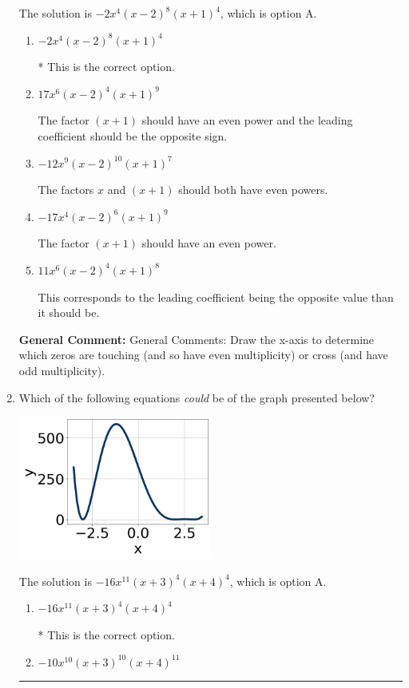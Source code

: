 \documentclass{extbook}[14pt]
\newcommand{\litem}[1]{\item #1

\rule{\textwidth}{0.4pt}}
\begin{document}
\begin{enumerate}
{The solution is \( -2x^{4} (x - 2)^{8} (x + 1)^{4} \), which is option A.\begin{enumerate}[label=\Alph*.]
\item \( -2x^{4} (x - 2)^{8} (x + 1)^{4} \)

* This is the correct option.
\item \( 17x^{6} (x - 2)^{4} (x + 1)^{9} \)

The factor $(x + 1)$ should have an even power and the leading coefficient should be the opposite sign.
\item \( -12x^{9} (x - 2)^{10} (x + 1)^{7} \)

The factors $x$ and $(x + 1)$ should both have even powers.
\item \( -17x^{4} (x - 2)^{6} (x + 1)^{9} \)

The factor $(x + 1)$ should have an even power.
\item \( 11x^{6} (x - 2)^{4} (x + 1)^{8} \)

This corresponds to the leading coefficient being the opposite value than it should be.
\end{enumerate}

\textbf{General Comment:} General Comments: Draw the x-axis to determine which zeros are touching (and so have even multiplicity) or cross (and have odd multiplicity).
}
\litem{
Which of the following equations \textit{could} be of the graph presented below?

\begin{center}
    \includegraphics[width=0.5\textwidth]{../Figures/polyGraphToFunctionB.png}
\end{center}


The solution is \( -16x^{11} (x + 3)^{4} (x + 4)^{4} \), which is option A.\begin{enumerate}[label=\Alph*.]
\item \( -16x^{11} (x + 3)^{4} (x + 4)^{4} \)

* This is the correct option.
\item \( -10x^{10} (x + 3)^{10} (x + 4)^{11} \)


\end{enumerate}}
\end{enumerate}
\end{document}
